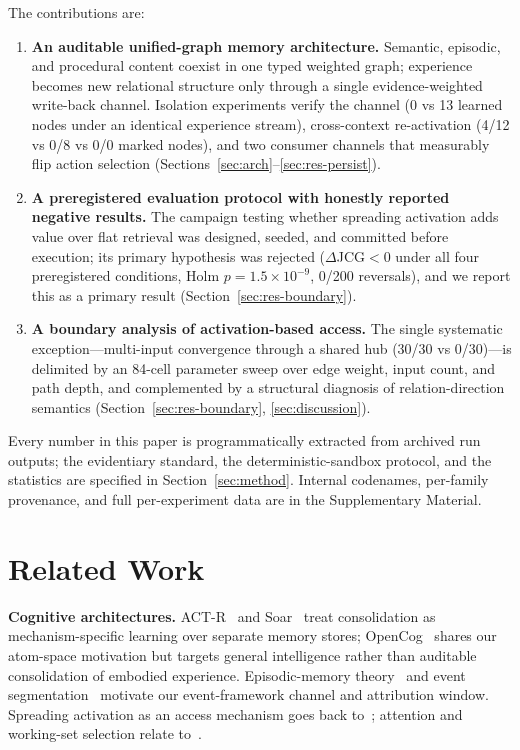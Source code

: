 \documentclass[10pt]{article}
\begin{document}
The contributions are:
\begin{enumerate}
\item \textbf{An auditable unified-graph memory architecture.} Semantic, episodic, and procedural content coexist in one typed weighted graph; experience becomes new relational structure only through a single evidence-weighted write-back channel. Isolation experiments verify the channel (0 vs 13 learned nodes under an identical experience stream), cross-context re-activation (4/12 vs 0/8 vs 0/0 marked nodes), and two consumer channels that measurably flip action selection (Sections~\ref{sec:arch}--\ref{sec:res-persist}).
\item \textbf{A preregistered evaluation protocol with honestly reported negative results.} The campaign testing whether spreading activation adds value over flat retrieval was designed, seeded, and committed before execution; its primary hypothesis was rejected ($\Delta$JCG${<}0$ under all four preregistered conditions, Holm $p{=}1.5\times10^{-9}$, 0/200 reversals), and we report this as a primary result (Section~\ref{sec:res-boundary}).
\item \textbf{A boundary analysis of activation-based access.} The single systematic exception---multi-input convergence through a shared hub (30/30 vs 0/30)---is delimited by an 84-cell parameter sweep over edge weight, input count, and path depth, and complemented by a structural diagnosis of relation-direction semantics (Section~\ref{sec:res-boundary}, \ref{sec:discussion}).
\end{enumerate}

Every number in this paper is programmatically extracted from archived run outputs; the evidentiary standard, the deterministic-sandbox protocol, and the statistics are specified in Section~\ref{sec:method}. Internal codenames, per-family provenance, and full per-experiment data are in the Supplementary Material.

\section{Related Work}
\label{sec:related}

\textbf{Cognitive architectures.} ACT-R~\citep{anderson2004integrated} and Soar~\citep{laird2012soar} treat consolidation as mechanism-specific learning over separate memory stores; OpenCog~\citep{hart2008opencog} shares our atom-space motivation but targets general intelligence rather than auditable consolidation of embodied experience. Episodic-memory theory~\citep{tulving1983elements,baddeley2000episodic} and event segmentation~\citep{zacks2007event,schacter2007remembering} motivate our event-framework channel and attribution window. Spreading activation as an access mechanism goes back to~\citet{collins1975spreading}; attention and working-set selection relate to~\citet{itti2001computational,posner1980orienting,cowan2001magical}.
\end{document}
